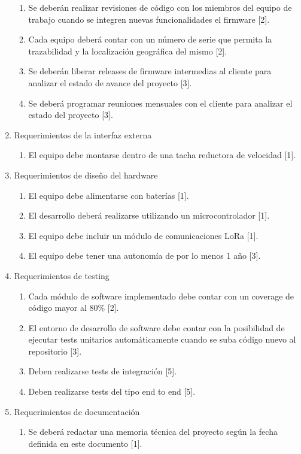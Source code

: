 \documentclass[
11pt, %
]{charter}
\begin{document}
\begin{enumerate}
\begin{enumerate}
			\item Se deberán realizar revisiones de código con los miembros del equipo de trabajo cuando se integren nuevas funcionalidades el firmware [2].
			\item Cada equipo deberá contar con un número de serie que permita la trazabilidad y la localización geográfica del mismo [2].
			\item Se deberán liberar releases de firmware intermedias al cliente para analizar el estado de avance del proyecto [3].
			\item Se deberá programar reuniones mensuales con el cliente para analizar el estado del proyecto [3].
		\end{enumerate}
	\item Requerimientos de la interfaz externa
		\begin{enumerate}
			\item El equipo debe montarse dentro de una tacha reductora de velocidad [1].
		\end{enumerate}
	\item Requerimientos de diseño del hardware
		\begin{enumerate}
			\item El equipo debe alimentarse con baterías [1].
			\item El desarrollo deberá realizarse utilizando un microcontrolador [1].
			\item El equipo debe incluir un módulo de comunicaciones LoRa [1].
			\item El equipo debe tener una autonomía de por lo menos 1 año [3].
		\end{enumerate}
	\item Requerimientos de testing
		\begin{enumerate}
			\item Cada módulo de software implementado debe contar con un coverage de código mayor al 80\% [2].
			\item El entorno de desarrollo de software debe contar con la posibilidad de ejecutar tests unitarios automáticamente cuando se suba código nuevo al repositorio [3].
			\item Deben realizarse tests de integración [5].
			\item Deben realizarse tests del tipo end to end [5].
		\end{enumerate}
	\item Requerimientos de documentación
		\begin{enumerate}
			\item Se deberá redactar una memoria técnica del proyecto según la fecha definida en este documento [1].

\end{enumerate}
\end{enumerate}
\end{document}
